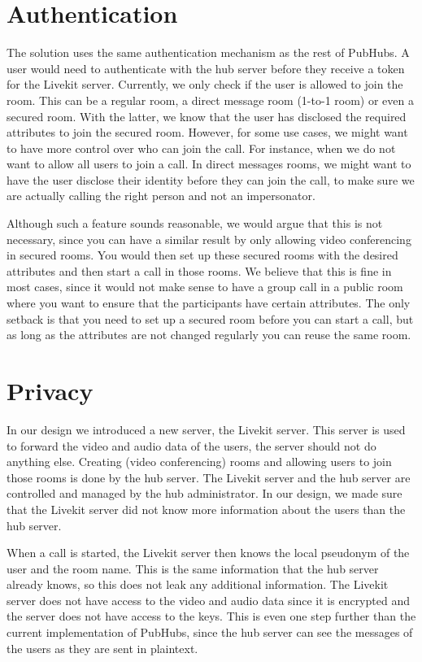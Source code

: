 \documentclass{report}
\begin{document}
\section{Authentication}
The solution uses the same authentication mechanism as the rest of PubHubs. A user would need to authenticate with the
hub server before they receive a token for the Livekit server. Currently, we only check if the user is allowed to
join the room. This can be a regular room, a direct message room (1-to-1 room) or even a secured room. With the latter, we know that the user has
disclosed the required attributes to join the secured room. However, for some use cases, we might want to have more
control over who can join the call. For instance, when we do not want to allow all users to join a call. In direct
messages rooms, we might want to have the user disclose their identity before they can join the call, to
make sure we are actually calling the right person and not an impersonator.

Although such a feature sounds reasonable, we would argue that this is not necessary, since you can have a similar
result by only allowing video conferencing in secured rooms. You would then set up these secured rooms with the
desired attributes and then start a call in those rooms. We believe that this is fine in most cases, since it would
not make sense to have a group call in a public room where you want to ensure that the participants have certain attributes.
The only setback is that you need to set up a secured room before you can start a call, but as long as the attributes
are not changed regularly you can reuse the same room.

\section{Privacy}
In our design we introduced a new server, the Livekit server. This server is used to forward the video and audio data
of the users, the server should not do anything else. Creating (video conferencing) rooms and allowing users to join
those rooms is done by the hub server. The Livekit server and the hub server are controlled and managed by the hub
administrator. In our design, we made sure that the Livekit server did not know more information about the users
than the hub server.

When a call is started, the Livekit server then knows the local pseudonym of the user and the room name. This is the
same information that the hub server already knows, so this does not leak any additional information. The Livekit server
does not have access to the video and audio data since it is encrypted and the server does not have access to the keys.
This is even one step further than the current implementation of PubHubs, since the hub server can see the messages of
the users as they are sent in plaintext.
\end{document}
